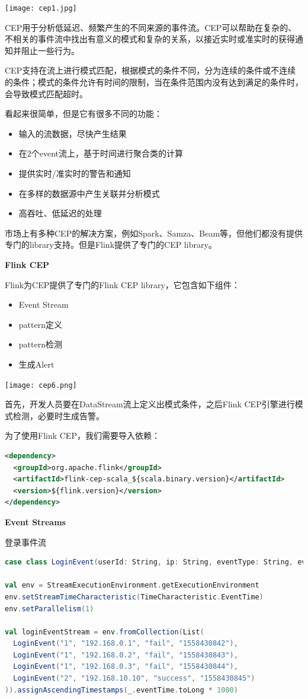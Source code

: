 \documentclass[oneside]{ctexbook}
\begin{document}
\noindent \texttt{[image: cep1.jpg]}

CEP用于分析低延迟、频繁产生的不同来源的事件流。CEP可以帮助在复杂的、不相关的事件流中找出有意义的模式和复杂的关系，以接近实时或准实时的获得通知并阻止一些行为。

CEP支持在流上进行模式匹配，根据模式的条件不同，分为连续的条件或不连续的条件；模式的条件允许有时间的限制，当在条件范围内没有达到满足的条件时，会导致模式匹配超时。

看起来很简单，但是它有很多不同的功能：

\begin{itemize}
\item 输入的流数据，尽快产生结果
\item 在2个event流上，基于时间进行聚合类的计算
\item 提供实时/准实时的警告和通知
\item 在多样的数据源中产生关联并分析模式
\item 高吞吐、低延迟的处理
\end{itemize}

市场上有多种CEP的解决方案，例如Spark、Samza、Beam等，但他们都没有提供专门的library支持。但是Flink提供了专门的CEP library。

\textbf{Flink CEP}

Flink为CEP提供了专门的Flink CEP library，它包含如下组件：

\begin{itemize}
\item Event Stream
\item pattern定义
\item pattern检测
\item 生成Alert
\end{itemize}

\noindent \texttt{[image: cep6.png]}

首先，开发人员要在DataStream流上定义出模式条件，之后Flink CEP引擎进行模式检测，必要时生成告警。

为了使用Flink CEP，我们需要导入依赖：

\begin{lstlisting}[language=xml]
<dependency>
  <groupId>org.apache.flink</groupId>
  <artifactId>flink-cep-scala_${scala.binary.version}</artifactId>
  <version>${flink.version}</version>
</dependency>
\end{lstlisting}

\textbf{Event Streams}

登录事件流

\begin{lstlisting}[language=scala]
case class LoginEvent(userId: String, ip: String, eventType: String, eventTime: String)

val env = StreamExecutionEnvironment.getExecutionEnvironment
env.setStreamTimeCharacteristic(TimeCharacteristic.EventTime)
env.setParallelism(1)

val loginEventStream = env.fromCollection(List(
  LoginEvent("1", "192.168.0.1", "fail", "1558430842"),
  LoginEvent("1", "192.168.0.2", "fail", "1558430843"),
  LoginEvent("1", "192.168.0.3", "fail", "1558430844"),
  LoginEvent("2", "192.168.10.10", "success", "1558430845")
)).assignAscendingTimestamps(_.eventTime.toLong * 1000)
\end{lstlisting}
\end{document}
